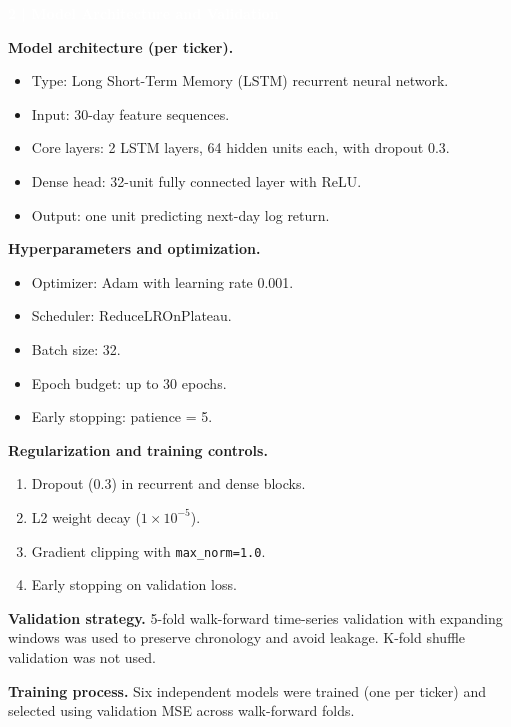 \documentclass[10pt,a4paper]{article}
\newcommand{\SectionBar}[1]{%
  \vspace{0.35em}
  \noindent\colorbox{ReportBlue}{%
    \parbox{\dimexpr\linewidth-2\fboxsep\relax}{%
      \vspace{2.5pt}\textcolor{white}{\bfseries\footnotesize #1}\vspace{2.5pt}
    }%
  }%
  \vspace{0.35em}
}
\begin{document}
\SectionBar{2 \;|\; Model Architecture and Validation}
{\fontsize{8}{10.3}\selectfont\justifying
\textbf{Model architecture (per ticker).}
\begin{itemize}
  \item Type: Long Short-Term Memory (LSTM) recurrent neural network.
  \item Input: 30-day feature sequences.
  \item Core layers: 2 LSTM layers, 64 hidden units each, with dropout 0.3.
  \item Dense head: 32-unit fully connected layer with ReLU.
  \item Output: one unit predicting next-day log return.
\end{itemize}

\textbf{Hyperparameters and optimization.}
\begin{itemize}
  \item Optimizer: Adam with learning rate 0.001.
  \item Scheduler: ReduceLROnPlateau.
  \item Batch size: 32.
  \item Epoch budget: up to 30 epochs.
  \item Early stopping: patience = 5.
\end{itemize}

\textbf{Regularization and training controls.}
\begin{enumerate}
  \item Dropout (0.3) in recurrent and dense blocks.
  \item L2 weight decay ($1\times10^{-5}$).
  \item Gradient clipping with \texttt{max\_norm=1.0}.
  \item Early stopping on validation loss.
\end{enumerate}

\textbf{Validation strategy.} 5-fold walk-forward time-series validation with expanding windows was used to preserve chronology and avoid leakage. K-fold shuffle validation was not used.

\textbf{Training process.} Six independent models were trained (one per ticker) and selected using validation MSE across walk-forward folds.
}
\end{document}
